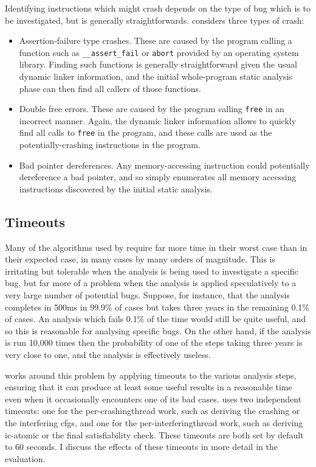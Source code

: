 {Identifying instructions which might crash depends on the type of bug
which is to be investigated, but is generally straightforwards.
{\Implementation} considers three types of crash:

\begin{itemize}
\item Assertion-failure type crashes.  These are caused by the program
  calling a function such as \verb|__assert_fail| or \verb|abort|
  provided by an operating system library.  Finding such functions is
  generally straightforward given the usual dynamic linker
  information, and the initial whole-program static analysis phase can
  then find all callers of those functions.
\item Double free errors.  These are caused by the program calling
  \verb|free| in an incorrect manner.  Again, the dynamic linker
  information allows {\implementation} to quickly find all calls to
  \verb|free| in the program, and these calls are used as the
  potentially-crashing instructions in the program.
\item Bad pointer dereferences.  Any memory-accessing instruction
  could potentially dereference a bad pointer, and so
  {\implementation} simply enumerates all memory accessing
  instructions discovered by the initial static analysis.
\end{itemize}

\subsection{Timeouts}

Many of the algorithms used by {\technique} require far more time in
their worst case than in their expected case, in many cases by many
orders of magnitude.  This is irritating but tolerable when the
analysis is being used to investigate a specific bug, but far more of
a problem when the analysis is applied speculatively to a very large
number of potential bugs.  Suppose, for instance, that the analysis
completes in 500ms in 99.9\% of cases but takes three years in the
remaining 0.1\% of cases.  An analysis which fails 0.1\% of the time
would still be quite useful, and so this is reasonable for analysing
specific bugs.  On the other hand, if the analysis is run 10,000 times
then the probability of one of the steps taking three years is very
close to one, and the analysis is effectively useless.

{\Technique} works around this problem by applying timeouts to the
various analysis steps, ensuring that it can produce at least some
useful results in a reasonable time even when it occasionally
encounters one of its bad cases.  {\Implementation} uses two
independent timeouts: one for the per-\gls{crashingthread} work, such
as deriving the crashing {\StateMachine} or the interfering
\glspl{cfg}, and one for the per-\gls{interferingthread} work, such as
deriving \gls{ic-atomic} or the final satisfiability check.  These
timeouts are both set by default to 60 seconds.  I discuss the effects
of these timeouts in more detail in the evaluation.

}

